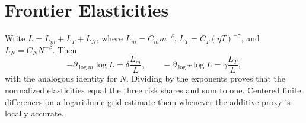 \section{Frontier Elasticities}

Write $L=L_m+L_T+L_N$, where
$L_m=C_m m^{-\delta}$, $L_T=C_T(\eta T)^{-\gamma}$, and
$L_N=C_NN^{-\beta}$. Then
\[
-\partial_{\log m}\log L=\delta\frac{L_m}{L},\qquad
-\partial_{\log T}\log L=\gamma\frac{L_T}{L},
\]
with the analogous identity for $N$. Dividing by the exponents proves that the
normalized elasticities equal the three risk shares and sum to one. Centered
finite differences on a logarithmic grid estimate them whenever the additive
proxy is locally accurate.
